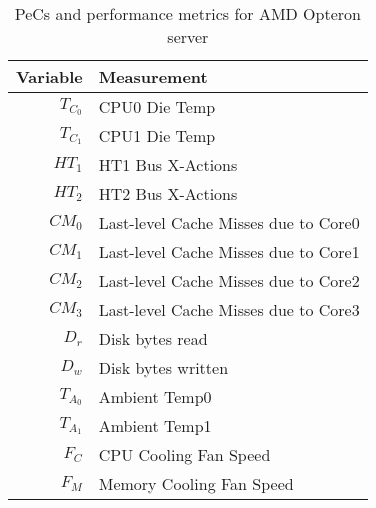 \begin{table}[t!]
  \caption{PeCs and performance metrics for AMD Opteron server}
  \label{tab:model}
  \centering
  \begin{tabular}{r l}
\hline
\textbf{Variable}&\textbf{Measurement}\\
\hline
$T_{C_{0}}$&CPU0 Die Temp\\
$T_{C_{1}}$&CPU1 Die Temp\\
$HT_{1}$&HT1 Bus X-Actions\\
$HT_{2}$&HT2 Bus X-Actions\\
$CM_{0}$&Last-level Cache Misses due to Core0\\
$CM_{1}$&Last-level Cache Misses due to Core1\\
$CM_{2}$&Last-level Cache Misses due to Core2\\
$CM_{3}$&Last-level Cache Misses due to Core3\\
$D_{r}$&Disk bytes read\\
$D_{w}$&Disk bytes written\\
$T_{A_{0}}$&Ambient Temp0\\
$T_{A_{1}}$&Ambient Temp1\\
$F_{C}$&CPU Cooling Fan Speed\\
$F_{M}$&Memory Cooling Fan Speed\\
\hline
  \end{tabular}
\end{table}
